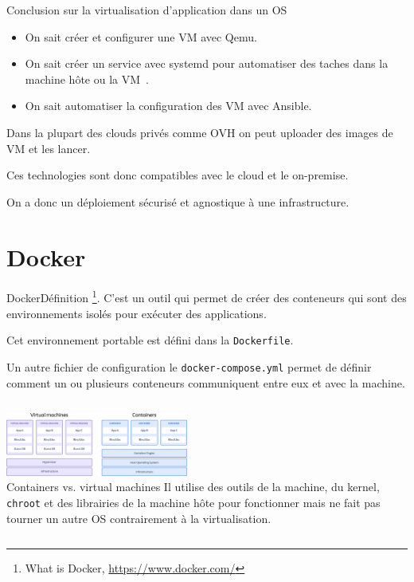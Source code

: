 \documentclass{beamer}
\begin{document}
    \begin{frame}{Conclusion sur la virtualisation d'application dans un OS}
        \begin{itemize}
            \item On sait créer et configurer une VM avec Qemu.
            \item On sait créer un service avec systemd pour automatiser des taches dans la machine hôte ou la VM~.
            \item On sait automatiser la configuration des VM avec Ansible.
        \end{itemize}
        \bigbreak
        Dans la plupart des clouds privés comme OVH on peut uploader des images de VM et les lancer.

        Ces technologies sont donc compatibles avec le cloud et le on-premise.

        On a donc un déploiement sécurisé et agnostique à une infrastructure.
    \end{frame}


    \section{Docker}\label{sec:docker}

    \begin{frame}{Docker}{Définition}
        \small
        \footnote{What is Docker, \url{https://www.docker.com/}}.
        \bigbreak
        C'est un outil qui permet de créer des conteneurs qui sont des environnements isolés pour exécuter des applications.

        Cet environnement portable est défini dans la \lstinline{Dockerfile}.

        Un autre fichier de configuration le \lstinline{docker-compose.yml} permet de définir comment un ou plusieurs conteneurs communiquent entre eux et avec la machine.
        \bigbreak
        \begin{columns}
            \centering
            \includegraphics[width=6cm]{image/docker-vs-vm} \\ Containers vs. virtual machines\footnotemark
            Il utilise des outils de la machine, du kernel, \lstinline{chroot} et des librairies de la machine hôte pour fonctionner mais ne fait pas tourner un autre OS contrairement à la virtualisation.
        \end{columns}
    \end{frame}
\end{document}
